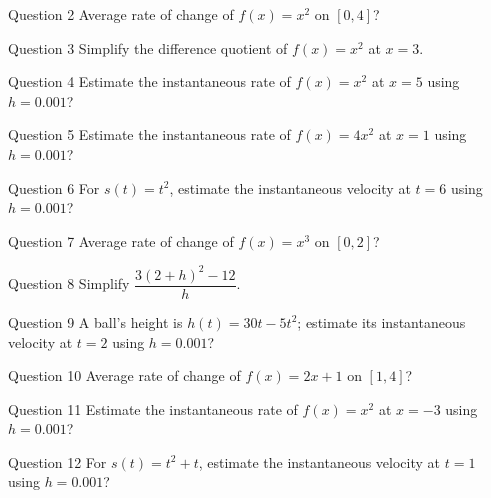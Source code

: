 \documentclass[11pt]{article}
\begin{document}
\begin{qbox}{Question 2}
Average rate of change of $f(x)=x^2$ on $[0,4]$?\workspace{2.4cm}
\end{qbox}

\begin{qbox}{Question 3}
Simplify the difference quotient of $f(x)=x^2$ at $x=3$.\workspace{2.4cm}
\end{qbox}

\begin{qbox}{Question 4}
Estimate the instantaneous rate of $f(x)=x^2$ at $x=5$ using $h=0.001$?\workspace{2.4cm}
\end{qbox}

\begin{qbox}{Question 5}
Estimate the instantaneous rate of $f(x)=4x^2$ at $x=1$ using $h=0.001$?\workspace{2.4cm}
\end{qbox}

\begin{qbox}{Question 6}
For $s(t)=t^2$, estimate the instantaneous velocity at $t=6$ using $h=0.001$?\workspace{2.4cm}
\end{qbox}

\begin{qbox}{Question 7}
Average rate of change of $f(x)=x^3$ on $[0,2]$?\workspace{2.4cm}
\end{qbox}

\begin{qbox}{Question 8}
Simplify $\dfrac{3(2+h)^2-12}{h}$.\workspace{2.4cm}
\end{qbox}

\begin{qbox}{Question 9}
A ball's height is $h(t)=30t-5t^2$; estimate its instantaneous velocity at $t=2$ using $h=0.001$?\workspace{2.4cm}
\end{qbox}

\begin{qbox}{Question 10}
Average rate of change of $f(x)=2x+1$ on $[1,4]$?\workspace{2.4cm}
\end{qbox}

\begin{qbox}{Question 11}
Estimate the instantaneous rate of $f(x)=x^2$ at $x=-3$ using $h=0.001$?\workspace{2.4cm}
\end{qbox}

\begin{qbox}{Question 12}
For $s(t)=t^2+t$, estimate the instantaneous velocity at $t=1$ using $h=0.001$?\workspace{2.4cm}
\end{qbox}
\end{document}
